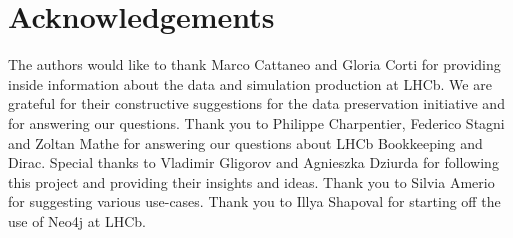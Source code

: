 \section *{Acknowledgements}

The authors would like to thank Marco Cattaneo and Gloria Corti for providing inside information about the data and simulation production at LHCb. We are grateful for their constructive suggestions for the data preservation initiative and for answering our questions. Thank you to Philippe Charpentier, Federico Stagni and Zoltan Mathe for answering our questions about LHCb Bookkeeping and Dirac. Special thanks to Vladimir Gligorov and Agnieszka Dziurda for following this project and providing their insights and ideas. Thank you to Silvia Amerio for suggesting various use-cases. Thank you to Illya Shapoval for starting off the use of Neo4j at LHCb.
